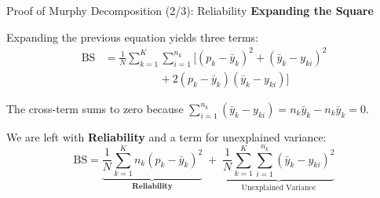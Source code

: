 \documentclass[aspectratio=169]{beamer}
\begin{document}
\begin{frame}{Proof of Murphy Decomposition (2/3): Reliability}
  \textbf{Expanding the Square}
  

  Expanding the previous equation yields three terms:
  \begin{align*}
    \text{BS} &= \frac{1}{N} \sum_{k=1}^K \sum_{i=1}^{n_k} \Big[ (p_k - \bar{y}_k)^2 + (\bar{y}_k - y_{ki})^2 \\
    &\quad \quad \quad \quad \quad + 2(p_k - \bar{y}_k)(\bar{y}_k - y_{ki}) \Big]
  \end{align*}


  The cross-term sums to zero because $\sum_{i=1}^{n_k} (\bar{y}_k - y_{ki}) = n_k\bar{y}_k - n_k\bar{y}_k = 0$.

  We are left with \textbf{Reliability} and a term for unexplained variance:
  \[
    \text{BS} = \underbrace{\frac{1}{N} \sum_{k=1}^K n_k (p_k - \bar{y}_k)^2}_{\textbf{Reliability}} \;+\; \underbrace{\frac{1}{N} \sum_{k=1}^K \sum_{i=1}^{n_k} (\bar{y}_k - y_{ki})^2}_{\text{Unexplained Variance}}
  \]
\end{frame}
\end{document}
